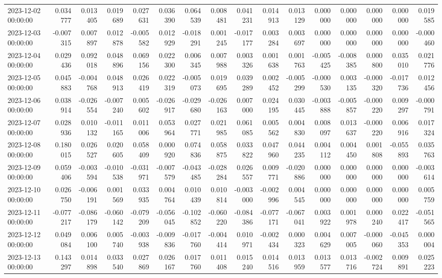 \begin{tabular}{lrrrrrrrrrrrrrrr}
2023-12-02 00:00:00 & 0.034777 & 0.013405 & 0.019689 & 0.027631 & 0.036390 & 0.064539 & 0.008481 & 0.041231 & 0.014913 & 0.013129 & 0.000000 & 0.000000 & 0.000000 & 0.000000 & 0.019585 \\
2023-12-03 00:00:00 & -0.007315 & 0.007897 & 0.012878 & -0.005582 & 0.012929 & -0.018291 & 0.001245 & -0.017177 & 0.003284 & 0.003697 & 0.000000 & 0.000000 & 0.000000 & 0.000000 & -0.000460 \\
2023-12-04 00:00:00 & 0.029436 & 0.092018 & 0.048896 & 0.069156 & 0.022300 & 0.006345 & 0.007988 & 0.003326 & 0.001638 & 0.001763 & -0.005425 & -0.008385 & 0.000800 & 0.035010 & 0.021776 \\
2023-12-05 00:00:00 & 0.045883 & -0.004768 & 0.048913 & 0.026419 & 0.022319 & -0.005073 & 0.019695 & 0.039289 & 0.002452 & -0.005299 & -0.000530 & 0.003135 & -0.000320 & -0.017736 & 0.012456 \\
2023-12-06 00:00:00 & 0.038914 & -0.026554 & -0.007240 & 0.005602 & -0.026917 & -0.029680 & -0.026163 & 0.007000 & 0.024195 & 0.030445 & -0.003888 & -0.005857 & -0.000220 & 0.009297 & -0.000791 \\
2023-12-07 00:00:00 & 0.028936 & 0.010132 & -0.011165 & 0.011006 & 0.053964 & 0.027771 & 0.021985 & 0.061085 & 0.005562 & 0.004830 & 0.008097 & 0.013637 & -0.000220 & 0.006916 & 0.017324 \\
2023-12-08 00:00:00 & 0.180015 & 0.026527 & 0.020605 & 0.058409 & 0.000920 & 0.074836 & 0.058875 & 0.033822 & 0.047960 & 0.044235 & 0.004112 & 0.004450 & 0.001808 & -0.055893 & 0.035763 \\
2023-12-09 00:00:00 & 0.059406 & -0.003594 & -0.010538 & -0.031971 & -0.007579 & -0.043485 & -0.028284 & 0.026557 & 0.009771 & -0.020886 & 0.000000 & 0.000000 & 0.000000 & 0.000000 & -0.003614 \\
2023-12-10 00:00:00 & 0.026750 & -0.006191 & 0.001569 & 0.033935 & 0.004764 & 0.010439 & 0.010814 & -0.003000 & -0.002996 & 0.004545 & 0.000000 & 0.000000 & 0.000000 & 0.000000 & 0.005759 \\
2023-12-11 00:00:00 & -0.077217 & -0.086179 & -0.060142 & -0.079209 & -0.056045 & -0.102852 & -0.060220 & -0.084386 & -0.077171 & -0.067041 & 0.003922 & 0.001978 & 0.000240 & 0.022417 & -0.051565 \\
2023-12-12 00:00:00 & 0.049084 & 0.006100 & 0.005740 & -0.003938 & -0.009836 & -0.017760 & -0.004414 & 0.010971 & -0.002434 & 0.000323 & 0.004629 & 0.007005 & -0.000060 & -0.045353 & 0.000004 \\
2023-12-13 00:00:00 & 0.143297 & 0.014898 & 0.033540 & 0.027869 & 0.026167 & 0.017760 & 0.011408 & 0.015240 & 0.014516 & 0.013959 & 0.013577 & 0.013716 & -0.002724 & 0.009891 & 0.025223 \\

\end{tabular}
